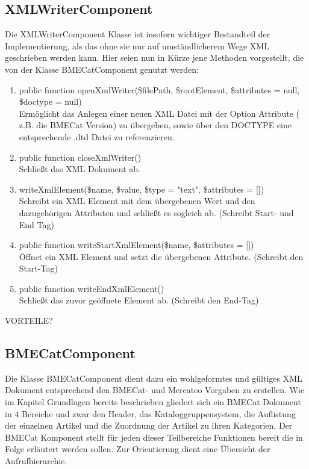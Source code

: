 	\subsection{XMLWriterComponent}
	
	Die XMLWriterComponent Klasse ist insofern wichtiger Bestandteil der Implementierung, als das ohne sie nur auf umständlicherem Wege XML geschrieben werden kann. Hier seien nun in Kürze jene Methoden vorgestellt, die von der Klasse BMECatComponent genutzt werden:
	
	\begin{enumerate}[noitemsep]
	\item public function openXmlWriter(\$filePath, \$rootElement, \$attributes = null, \$doctype = null) \\
		  Ermöglicht das Anlegen einer neuen XML Datei mit der Option Attribute ( z.B. die BMECat Version) zu übergeben, sowie über den DOCTYPE eine entsprechende .dtd Datei zu referenzieren.
	\item public function closeXmlWriter() \\
		  Schließt das XML Dokument ab.
	\item writeXmlElement(\$name, \$value, \$type = "text", \$attributes = [])\\
		  Schreibt ein XML Element mit dem übergebenen Wert und den dazugehörigen Attributen und schließt es sogleich ab. (Schreibt Start- und End Tag)
	\item public function writeStartXmlElement(\$name, \$attributes = [])\\
		  Öffnet ein XML Element und setzt die übergebenen Attribute. (Schreibt den Start-Tag)
	\item public function writeEndXmlElement()\\
		  Schließt das zuvor geöffnete Element ab. (Schreibt den End-Tag)
	\end{enumerate}
	
	VORTEILE? 
	
	\subsection{BMECatComponent}
	
	Die Klasse BMECatComponent dient dazu ein wohlgeformtes und gültiges XML Dokument entsprechend den BMECat- und Mercateo Vorgaben zu erstellen. Wie im Kapitel Grundlagen bereits beschrieben gliedert sich ein BMECat Dokument in 4 Bereiche und zwar den Header, das Kataloggruppensystem, die Auflistung der einzelnen Artikel und die Zuordnung der Artikel zu ihren Kategorien. Der BMECat Komponent stellt für jeden dieser Teilbereiche Funktionen bereit die in Folge erläutert werden sollen.
	Zur Orientierung dient eine Übersicht der Aufrufhierarchie.\\
	
